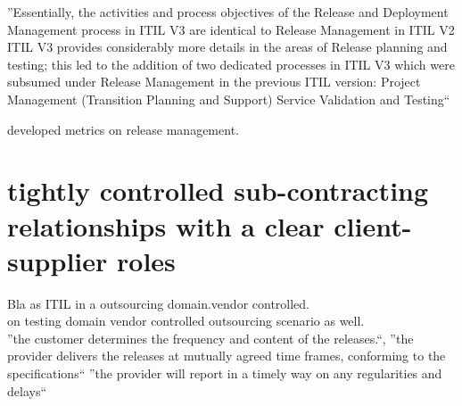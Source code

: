     ''Essentially, the activities and process objectives of the Release and Deployment Management process in ITIL V3 are identical to Release Management in ITIL V2
    ITIL V3 provides considerably more details in the areas of Release planning and testing; this led to the addition of two dedicated processes in ITIL V3 which were subsumed under Release Management in the previous ITIL version:
        Project Management (Transition Planning and Support)
        Service Validation and Testing``
        

  \citet{McNaughtonRay_et_al2010} developed metrics on release management. 
 
 
 
 \section{tightly controlled sub-contracting relationships with a clear client-supplier roles}
 
 Bla
 \citet{BaarsHorakh_et_al2007} as ITIL in a outsourcing domain.vendor controlled.  \\ 
 \citet{LuKakola2011} on testing domain vendor controlled outsourcing scenario as well. \\ 

  ''the customer determines the frequency and content of the releases.``, 
  ''the provider delivers the releases at mutually agreed time frames, conforming to the specifications`` 
  ''the provider will report in a timely way on any regularities and delays``  \cite[p.45][]{Chittenden1970}
  
 
 
% 
% 
% 
